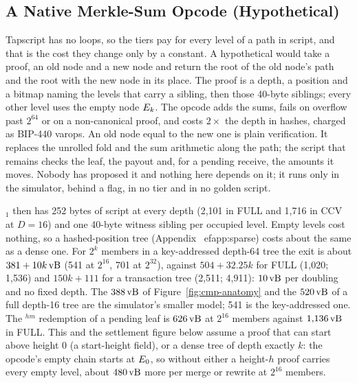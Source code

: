
\subsection{A Native Merkle-Sum Opcode (Hypothetical)}\label{app:native}

Tapscript has no loops, so the tiers pay for every level of a path in
script, and that is the cost they change only by a constant. A hypothetical
 would take a proof, an old node and a new node and
return the root of the old node's path and the root with the new node in
its place. The proof is a depth, a position and a bitmap naming the levels
that carry a sibling, then those 40-byte siblings; every other level uses
the empty node $E_k$. The opcode adds the sums, fails on overflow past
$2^{64}$ or on a non-canonical proof, and costs $2\times$ the depth in
hashes, charged as BIP-440 varops. An old node equal to the new one is
plain verification. It replaces the unrolled fold and the sum arithmetic along the path; the script that remains checks the leaf, the payout and, for a pending receive, the amounts it moves. Nobody has proposed it and nothing here depends on it; it
runs only in the simulator, behind a flag, in no tier and in no golden
script.

$_1$ then has 252 bytes of script at every depth (2{,}101 in FULL
and 1{,}716 in CCV at $D = 16$) and one 40-byte witness sibling per
occupied level. Empty levels cost nothing, so a hashed-position tree (Appendix~
ef{app:sparse}) costs about the same as a dense one. For $2^k$
members in a key-addressed depth-64 tree the exit is about $381 + 10k\,\mathrm{vB}$
(541 at $2^{16}$, 701 at $2^{32}$), against $504 + 32.25k$ for FULL (1{,}020;
1{,}536) and $150k + 111$ for a transaction tree (2{,}511; 4{,}911):
$10\,\mathrm{vB}$ per doubling and no fixed depth. The $388\,\mathrm{vB}$ of
Figure~\ref{fig:cmp-anatomy} and the $520\,\mathrm{vB}$ of a full depth-16 tree are the
simulator's smaller model; 541 is the key-addressed one. The
$^{hm}$ redemption of a pending leaf is $626\,\mathrm{vB}$ at $2^{16}$
members against $1{,}136\,\mathrm{vB}$ in FULL. This and the settlement figure below assume a proof that can start above height 0 (a start-height field), or a dense tree of depth exactly $k$: the opcode's empty chain starts at $E_0$, so without either a height-$h$ proof carries every empty level, about $480\,\mathrm{vB}$ more per merge or rewrite at $2^{16}$ members.

